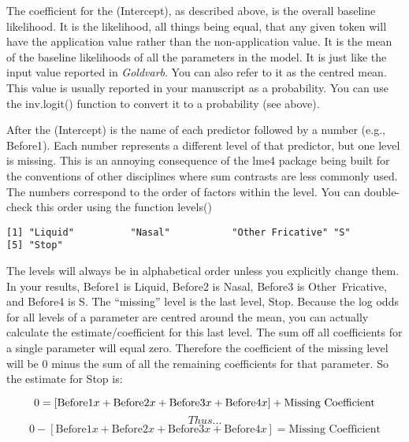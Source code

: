 \documentclass[
  10pt,
  letterpaper]{article}
\newenvironment{Shaded}{\begin{snugshade}}{\end{snugshade}}
\newcommand{\CommentTok}[1]{\textcolor[rgb]{0.37,0.37,0.37}{#1}}
\newcommand{\FunctionTok}[1]{\textcolor[rgb]{0.28,0.35,0.67}{#1}}
\newcommand{\NormalTok}[1]{\textcolor[rgb]{0.00,0.23,0.31}{#1}}
\newcommand{\SpecialCharTok}[1]{\textcolor[rgb]{0.37,0.37,0.37}{#1}}
\renewcommand\texttt[1]{{\ttfamily\color{BrickRed}#1}}
\begin{document}
The coefficient for the \texttt{(Intercept)}, as described above, is the
overall baseline likelihood. It is the likelihood, all things being
equal, that any given token will have the application value rather than
the non-application value. It is the mean of the baseline likelihoods of
all the parameters in the model. It is just like the input value
reported in \emph{Goldvarb}. You can also refer to it as the centred
mean. This value is usually reported in your manuscript as a
probability. You can use the \texttt{inv.logit()} function to convert it
to a probability (see above).

After the \texttt{(Intercept)} is the name of each predictor followed by
a number (e.g., \texttt{Before1}). Each number represents a different
level of that predictor, but one level is missing. This is an annoying
consequence of the \texttt{lme4} package being built for the conventions
of other disciplines where sum contrasts are less commonly used. The
numbers correspond to the order of factors within the level. You can
double-check this order using the function \texttt{levels()}

\begin{Shaded}
\end{Shaded}

\begin{verbatim}
[1] "Liquid"          "Nasal"           "Other Fricative" "S"              
[5] "Stop"           
\end{verbatim}

The levels will always be in alphabetical order unless you explicitly
change them. In your results, \texttt{Before1} is \texttt{Liquid},
\texttt{Before2} is \texttt{Nasal}, \texttt{Before3} is
\texttt{Other\ Fricative}, and \texttt{Before4} is \texttt{S}. The
``missing'' level is the last level, \texttt{Stop}. Because the log odds
for all levels of a parameter are centred around the mean, you can
actually calculate the estimate/coefficient for this last level. The sum
off all coefficients for a single parameter will equal zero. Therefore
the coefficient of the missing level will be 0 minus the sum of all the
remaining coefficients for that parameter. So the estimate for
\texttt{Stop} is:

\begin{equation*}
0= [\text{Before1}x + \text{Before2}x + \text{Before3}x + \text{Before4}x] + \text{Missing Coefficient}\\
\end{equation*}$$ Thus... $$\begin{equation*}
0- [\text{Before1}x + \text{Before2}x + \text{Before3}x + \text{Before4}x] =\text{Missing Coefficient}
\end{equation*}
\end{document}
